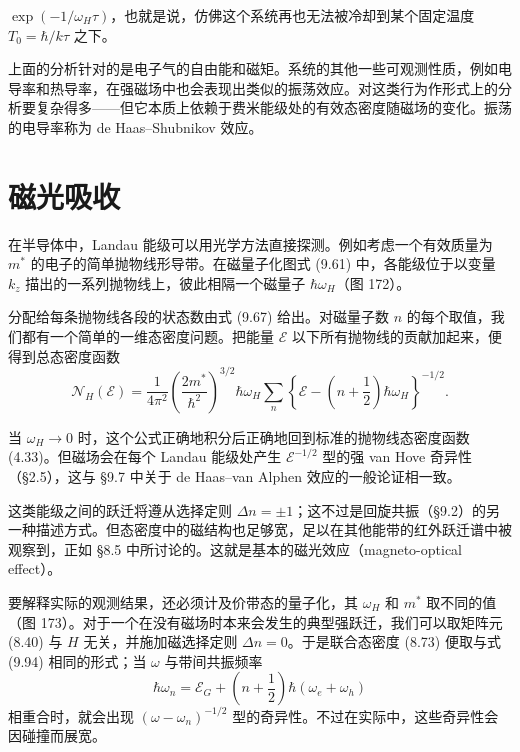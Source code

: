 $\exp(-1/\omega_{H}\tau)$，也就是说，仿佛这个系统再也无法被冷却到某个固定温度 $T_{0}=\hbar/k\tau$ 之下。

上面的分析针对的是电子气的自由能和磁矩。系统的其他一些可观测性质，例如电导率和热导率，在强磁场中也会表现出类似的振荡效应。对这类行为作形式上的分析要复杂得多——但它本质上依赖于费米能级处的有效态密度随磁场的变化。振荡的电导率称为 de Haas--Shubnikov 效应。

\section{磁光吸收}

在半导体中，Landau 能级可以用光学方法直接探测。例如考虑一个有效质量为 $m^{*}$ 的电子的简单抛物线形导带。在磁量子化图式 (9.61) 中，各能级位于以变量 $k_{z}$ 描出的一系列抛物线上，彼此相隔一个磁量子 $\hbar\omega_{H}$（图 172）。


分配给每条抛物线各段的状态数由式 (9.67) 给出。对磁量子数 $n$ 的每个取值，我们都有一个简单的一维态密度问题。把能量 $\mathcal{E}$ 以下所有抛物线的贡献加起来，便得到总态密度函数
\begin{equation*}
\mathcal{N}_{H}(\mathcal{E})=\frac{1}{4\pi^{2}}\left(\frac{2m^{*}}{\hbar^{2}}\right)^{3/2}\hbar\omega_{H}\sum_{n}\left\{\mathcal{E}-\left(n+\frac{1}{2}\right)\hbar\omega_{H}\right\}^{-1/2}.
\tag{9.94}
\end{equation*}


当 $\omega_{H}\to 0$ 时，这个公式正确地积分后正确地回到标准的抛物线态密度函数 (4.33)。但磁场会在每个 Landau 能级处产生 $\mathcal{E}^{-1/2}$ 型的强 van Hove 奇异性（§2.5），这与 §9.7 中关于 de Haas--van Alphen 效应的一般论证相一致。

这类能级之间的跃迁将遵从选择定则 $\Delta n=\pm 1$；这不过是回旋共振（§9.2）的另一种描述方式。但态密度中的磁结构也足够宽，足以在其他能带的红外跃迁谱中被观察到，正如 §8.5 中所讨论的。这就是基本的磁光效应（magneto-optical effect）。

要解释实际的观测结果，还必须计及价带态的量子化，其 $\omega_{H}$ 和 $m^{*}$ 取不同的值（图 173）。对于一个在没有磁场时本来会发生的典型强跃迁，我们可以取矩阵元 (8.40) 与 $H$ 无关，并施加磁选择定则 $\Delta n=0$。于是联合态密度 (8.73) 便取与式 (9.94) 相同的形式；当 $\omega$ 与带间共振频率
\begin{equation*}
\hbar\omega_{n}=\mathcal{E}_{G}+\left(n+\frac{1}{2}\right)\hbar\left(\omega_{e}+\omega_{h}\right)
\tag{9.95}
\end{equation*}
相重合时，就会出现 $(\omega-\omega_{n})^{-1/2}$ 型的奇异性。不过在实际中，这些奇异性会因碰撞而展宽。

